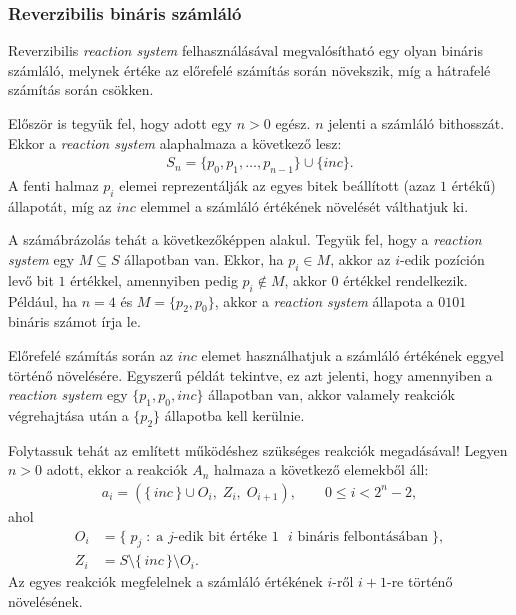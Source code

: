 \documentclass[12pt]{article}
\theoremstyle{definition}
\theoremstyle{remark}
\theoremstyle{plain}
\begin{document}
    \subsubsection*{Reverzibilis bináris számláló}

    Reverzibilis \textit{reaction system} felhasználásával megvalósítható egy olyan bináris számláló, melynek értéke az előrefelé számítás során növekszik, míg a hátrafelé számítás során csökken.

    Először is tegyük fel, hogy adott egy $n > 0$ egész. $n$ jelenti a számláló bithosszát. Ekkor a \textit{reaction system} alaphalmaza a következő lesz:
    \begin{align*}
        S_{n} = \{ p_{0}, p_{1}, \ldots, p_{n - 1}\} \cup \{ \textit{inc} \}.
    \end{align*}
    A fenti halmaz $p_{i}$ elemei reprezentálják az egyes bitek beállított (azaz $1$ értékű) állapotát, míg az $\textit{inc}$ elemmel a számláló értékének növelését válthatjuk ki.

    A számábrázolás tehát a következőképpen alakul. Tegyük fel, hogy a \textit{reaction system} egy $M \subseteq S$ állapotban van. Ekkor, ha $p_{i} \in M$, akkor az $i$-edik pozíción levő bit $1$ értékkel, amennyiben pedig $p_{i} \notin M$, akkor $0$ értékkel rendelkezik. Például, ha $n = 4$ és $M = \{p_{2}, p_{0}\}$, akkor a \textit{reaction system} állapota a $0101$ bináris számot írja le.
    
    Előrefelé számítás során az $\textit{inc}$ elemet használhatjuk a számláló értékének eggyel történő növelésére. Egyszerű példát tekintve, ez azt jelenti, hogy amennyiben a \textit{reaction system} egy $\{p_{1}, p_{0}, \textit{inc}\}$ állapotban van, akkor valamely reakciók végrehajtása után a $\{ p_{2} \}$ állapotba kell kerülnie.

    Folytassuk tehát az említett működéshez szükséges reakciók megadásával! Legyen $n > 0$ adott, ekkor a reakciók $A_{n}$ halmaza a következő elemekből áll:
    \begin{align*}
        a_{i} = (\{ \, \textit{inc} \, \} \cup O_{i}, \; Z_{i}, \; O_{i + 1}), \qquad 0 \leq i < 2^{n} - 2,
    \end{align*}
    ahol
    \begin{align*}
        O_{i} &= \{ \; p_{j} \; : \; \text{a $j$-edik bit értéke $1$ $i$ bináris felbontásában} \; \}, \\
        Z_{i} &= S \setminus\{ \, \textit{inc} \, \} \setminus O_{i}.
    \end{align*}
    Az egyes reakciók megfelelnek a számláló értékének $i$-ről $i + 1$-re történő növelésének.
\end{document}

